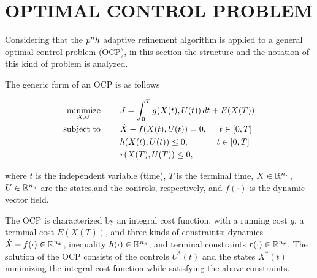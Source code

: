 \section*{OPTIMAL CONTROL PROBLEM}

Considering that the $p^{n}h$ adaptive refinement algorithm is applied to a general optimal control problem (OCP), in this section the structure and the notation of this kind of problem is analyzed.


The generic form of an OCP is as follows


\begin{subequations}\label{OCP}
	\begin{align}
	\underset{X,U}{\text{minimize}}\hspace{8mm} &J = \int_{0}^{T}g(X(t),U(t))\,dt + E(X(T)) \label{eq:cost}\\
	\text{subject to} \hspace{8mm} &\dot{X} -  f(X(t),U(t)) = 0, \hspace{5mm} t \in[0,T] \label{eq:dyn}\\
	& h(X(t),U(t)) \leq 0,  \hspace{11.5mm} t \in[0,T] \label{eq:path}\\
	& r(X(T),U(T)) \leq 0, \label{eq:terminal}		
	\end{align}
\end{subequations}

where $t$ is the independent variable (time), $T$ is the terminal time, $X \in \mathbb{R}^{n_{x}}$, $U \in \mathbb{R}^{n_{u}}$ are the states,and the controls, respectively, and $f (\cdot)$ is the dynamic vector field. 

The OCP is characterized by an integral cost function, with a running cost $g$, a terminal cost $E(X(T))$, and three kinds of constraints: dynamics $\dot{X}-f(\cdot) \in \mathbb{R}^{n_{x}}$, inequality $h(\cdot) \in \mathbb{R}^{n_{h}}$, and terminal constraints $r(\cdot) \in \mathbb{R}^{n_{r}}$.
The solution of the OCP  consists of the controls $U^{*}(t)$ and the states $X^*(t)$  minimizing the integral cost function while satisfying the above constraints.


